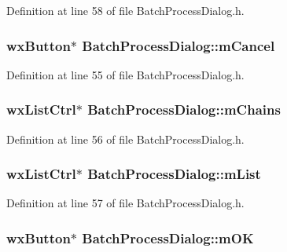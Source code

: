 Definition at line 58 of file Batch\+Process\+Dialog.\+h.

\subsubsection[{\texorpdfstring{m\+Cancel}{mCancel}}]{\setlength{\rightskip}{0pt plus 5cm}wx\+Button$\ast$ Batch\+Process\+Dialog\+::m\+Cancel}\hypertarget{class_batch_process_dialog_ac4b27be6db181a427e3d037d8fa846b6}{}\label{class_batch_process_dialog_ac4b27be6db181a427e3d037d8fa846b6}


Definition at line 55 of file Batch\+Process\+Dialog.\+h.

\subsubsection[{\texorpdfstring{m\+Chains}{mChains}}]{\setlength{\rightskip}{0pt plus 5cm}wx\+List\+Ctrl$\ast$ Batch\+Process\+Dialog\+::m\+Chains}\hypertarget{class_batch_process_dialog_a5b91922abe0128e3ef8b0a8bb9cac051}{}\label{class_batch_process_dialog_a5b91922abe0128e3ef8b0a8bb9cac051}


Definition at line 56 of file Batch\+Process\+Dialog.\+h.

\subsubsection[{\texorpdfstring{m\+List}{mList}}]{\setlength{\rightskip}{0pt plus 5cm}wx\+List\+Ctrl$\ast$ Batch\+Process\+Dialog\+::m\+List}\hypertarget{class_batch_process_dialog_ab8ad3e252fc7a32ae3c4305d746d353d}{}\label{class_batch_process_dialog_ab8ad3e252fc7a32ae3c4305d746d353d}


Definition at line 57 of file Batch\+Process\+Dialog.\+h.

\subsubsection[{\texorpdfstring{m\+OK}{mOK}}]{\setlength{\rightskip}{0pt plus 5cm}wx\+Button$\ast$ Batch\+Process\+Dialog\+::m\+OK}\hypertarget{class_batch_process_dialog_a0e93b4e5ad33df0e9e3cd26f77b10b0b}{}\label{class_batch_process_dialog_a0e93b4e5ad33df0e9e3cd26f77b10b0b}


